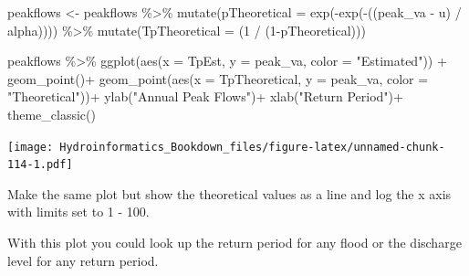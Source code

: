 \documentclass[
]{book}
\newenvironment{Shaded}{\begin{snugshade}}{\end{snugshade}}
\newcommand{\AttributeTok}[1]{\textcolor[rgb]{0.77,0.63,0.00}{#1}}
\newcommand{\DecValTok}[1]{\textcolor[rgb]{0.00,0.00,0.81}{#1}}
\newcommand{\FunctionTok}[1]{\textcolor[rgb]{0.00,0.00,0.00}{#1}}
\newcommand{\NormalTok}[1]{#1}
\newcommand{\OtherTok}[1]{\textcolor[rgb]{0.56,0.35,0.01}{#1}}
\newcommand{\SpecialCharTok}[1]{\textcolor[rgb]{0.00,0.00,0.00}{#1}}
\newcommand{\StringTok}[1]{\textcolor[rgb]{0.31,0.60,0.02}{#1}}
\begin{document}
\begin{Shaded}
\begin{Highlighting}[]
\NormalTok{peakflows }\OtherTok{\textless{}{-}}\NormalTok{ peakflows }\SpecialCharTok{\%\textgreater{}\%} \FunctionTok{mutate}\NormalTok{(}\AttributeTok{pTheoretical =} 
                                    \FunctionTok{exp}\NormalTok{(}\SpecialCharTok{{-}}\FunctionTok{exp}\NormalTok{(}\SpecialCharTok{{-}}\NormalTok{((peak\_va }\SpecialCharTok{{-}}\NormalTok{ u) }\SpecialCharTok{/}\NormalTok{ alpha)))) }\SpecialCharTok{\%\textgreater{}\%}
                           \FunctionTok{mutate}\NormalTok{(}\AttributeTok{TpTheoretical =}\NormalTok{ (}\DecValTok{1} \SpecialCharTok{/}\NormalTok{ (}\DecValTok{1}\SpecialCharTok{{-}}\NormalTok{pTheoretical)))}


\NormalTok{peakflows }\SpecialCharTok{\%\textgreater{}\%} \FunctionTok{ggplot}\NormalTok{(}\FunctionTok{aes}\NormalTok{(}\AttributeTok{x =}\NormalTok{ TpEst, }\AttributeTok{y =}\NormalTok{ peak\_va, }\AttributeTok{color =} \StringTok{"Estimated"}\NormalTok{)) }\SpecialCharTok{+}
  \FunctionTok{geom\_point}\NormalTok{()}\SpecialCharTok{+}
  \FunctionTok{geom\_point}\NormalTok{(}\FunctionTok{aes}\NormalTok{(}\AttributeTok{x =}\NormalTok{ TpTheoretical, }\AttributeTok{y =}\NormalTok{ peak\_va, }\AttributeTok{color =} \StringTok{"Theoretical"}\NormalTok{))}\SpecialCharTok{+}
  \FunctionTok{ylab}\NormalTok{(}\StringTok{"Annual Peak Flows"}\NormalTok{)}\SpecialCharTok{+}
  \FunctionTok{xlab}\NormalTok{(}\StringTok{"Return Period"}\NormalTok{)}\SpecialCharTok{+}
  \FunctionTok{theme\_classic}\NormalTok{() }
\end{Highlighting}
\end{Shaded}

\texttt{[image: Hydroinformatics\_Bookdown\_files/figure-latex/unnamed-chunk-114-1.pdf]}

Make the same plot but show the theoretical values as a line and log the x axis with limits set to 1 - 100.

With this plot you could look up the return period for any flood or the discharge level for any return period.
\end{document}

